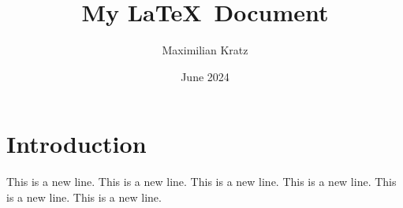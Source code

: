 \documentclass{article}
\title{My \LaTeX~Document}
\author{Maximilian Kratz}
\date{June 2024}
\begin{document}
\maketitle

\section{Introduction}
This is a new line.
This is a new line.
This is a new line.
This is a new line.
This is a new line.
This is a new line.
\end{document}
